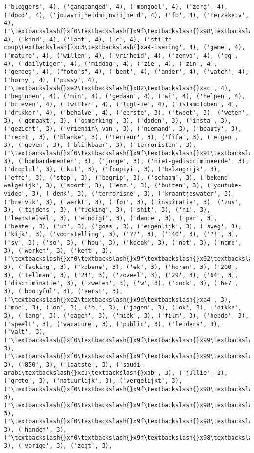 \documentclass{article}
\begin{document}
\begin{Verbatim}[commandchars=\\\{\}]
('bloggers', 4), ('gangbanged', 4), ('mongool', 4), ('zorg', 4), ('dood', 4), ('jouwvrijheidmijnvrijheid', 4), ('fb', 4), ('terzaketv', 4), ('\textbackslash{}xf0\textbackslash{}x9f\textbackslash{}x98\textbackslash{}x8b', 4), ('kind', 4), ('laat', 4), ('c', 4), ('stilte-coup\textbackslash{}xc3\textbackslash{}xa9-isering', 4), ('game', 4), ('mature', 4), ('willen', 4), ('vrijheid', 4), ('zenvo', 4), ('gg', 4), ('dailytiger', 4), ('middag', 4), ('zie', 4), ('zin', 4), ('genoeg', 4), ("foto's", 4), ('bent', 4), ('ander', 4), ('watch', 4), ('horny', 4), ('pussy', 4), ('\textbackslash{}xe2\textbackslash{}x82\textbackslash{}xac', 4), ('beginnen', 4), ('min', 4), ('gedaan', 4), ('wi', 4), ('helpen', 4), ('brieven', 4), ('twitter', 4), ('ligt-ie', 4), ('islamofoben', 4), ('drukker', 4), ('behalve', 4), ('eerste', 3), ('tweet', 3), ('weten', 3), ('gemaakt', 3), ('opmerking', 3), ('doden', 3), ('insta', 3), ('gezicht', 3), ('vriendin\_van', 3), ('niemand', 3), ('beauty', 3), ('recht', 3), ('blanke', 3), ('terreur', 3), ('fifa', 3), ('eigen', 3), ('geven', 3), ('blijkbaar', 3), ('terroristen', 3), ('\textbackslash{}xf0\textbackslash{}x9f\textbackslash{}x91\textbackslash{}x8f', 3), ('bombardementen', 3), ('jonge', 3), ('niet-gediscrimineerde', 3), ('droplul', 3), ('kut', 3), ('fcopiyi', 3), ('belangrijk', 3), ('effe', 3), ('stop', 3), ('begrip', 3), ('schaam', 3), ('bekend-walgelijk', 3), ('soort', 3), ('enz.', 3), ('buiten', 3), ('youtube-video', 3), ('denk', 3), ('terrorisme', 3), ('kraantjeswater', 3), ('breivik', 3), ('werkt', 3), ('for', 3), ('inspiratie', 3), ('zus', 3), ('tijdens', 3), ('fucking', 3), ('shit', 3), ('ni', 3), ('leenstelsel', 3), ('eindigt', 3), ('dance', 3), ('per', 3), ('beste', 3), ('uh', 3), ('goes', 3), ('eigenlijk', 3), ('sweg', 3), ('kijk', 3), ('voorstelling', 3), ('??', 3), ('140', 3), ('?!', 3), ('sy', 3), ('so', 3), ('hou', 3), ('kocak', 3), ('not', 3), ('name', 3), ('werken', 3), ('kent', 3), ('\textbackslash{}xf0\textbackslash{}x9f\textbackslash{}x92\textbackslash{}x9c', 3), ('facking', 3), ('kobane', 3), ('ek', 3), ('horen', 3), ('200', 3), ('tellman', 3), ('24', 3), ('zoveel', 3), ('29', 3), ('64', 3), ('discriminatie', 3), ('zweten', 3), ('w', 3), ('cock', 3), ('6e7', 3), ('bootyful', 3), ('eerst', 3), ('\textbackslash{}xe2\textbackslash{}x9d\textbackslash{}xa4', 3), ('moe', 3), ('on', 3), ('o.', 3), ('jagen', 3), ('ok', 3), ('dikke', 3), ('lang', 3), ('dagen', 3), ('mick', 3), ('film', 3), ('hebdo', 3), ('speelt', 3), ('vacature', 3), ('public', 3), ('leiders', 3), ('valt', 3), ('\textbackslash{}xf0\textbackslash{}x9f\textbackslash{}x99\textbackslash{}x8b', 3), ('\textbackslash{}xf0\textbackslash{}x9f\textbackslash{}x99\textbackslash{}x8c', 3), ('850', 3), ('laatste', 3), ('saudi-arabi\textbackslash{}xc3\textbackslash{}xab', 3), ('jullie', 3), ('grote', 3), ('natuurlijk', 3), ('vergelijkt', 3), ('\textbackslash{}xf0\textbackslash{}x9f\textbackslash{}x98\textbackslash{}x92', 3), ('\textbackslash{}xf0\textbackslash{}x9f\textbackslash{}x98\textbackslash{}x89', 3), ('\textbackslash{}xf0\textbackslash{}x9f\textbackslash{}x98\textbackslash{}x83', 3), ('handen', 3), ('\textbackslash{}xf0\textbackslash{}x9f\textbackslash{}x98\textbackslash{}x90', 3), ('vorige', 3), ('zegt', 3), 
\end{Verbatim}
\end{document}
